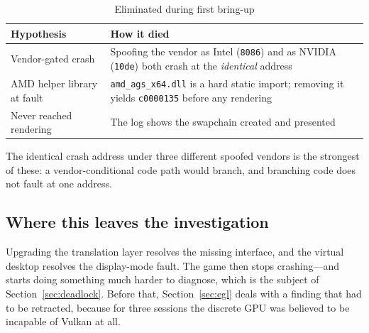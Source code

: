 \begin{table}[htbp]
\caption{Eliminated during first bring-up}
\label{tab:elim-g1}
\centering
\footnotesize
\begin{tabularx}{\columnwidth}{@{}L{2.9cm}X@{}}
\toprule
\textbf{Hypothesis} & \textbf{How it died} \\
\midrule
Vendor-gated crash & Spoofing the vendor as Intel (\verb|8086|) and as NVIDIA
                     (\verb|10de|) both crash at the \emph{identical} address \\
AMD helper library at fault & \verb|amd_ags_x64.dll| is a hard static import;
                              removing it yields \verb|c0000135| before any
                              rendering \\
Never reached rendering & The log shows the swapchain created and presented \\
\bottomrule
\end{tabularx}
\end{table}

The identical crash address under three different spoofed vendors is the
strongest of these: a vendor-conditional code path would branch, and branching
code does not fault at one address.

\subsection{Where this leaves the investigation}

Upgrading the translation layer resolves the missing interface, and the virtual
desktop resolves the display-mode fault. The game then stops crashing---and
starts doing something much harder to diagnose, which is the subject of
Section~\ref{sec:deadlock}. Before that, Section~\ref{sec:egl} deals with a
finding that had to be retracted, because for three sessions the discrete GPU was
believed to be incapable of Vulkan at all.
